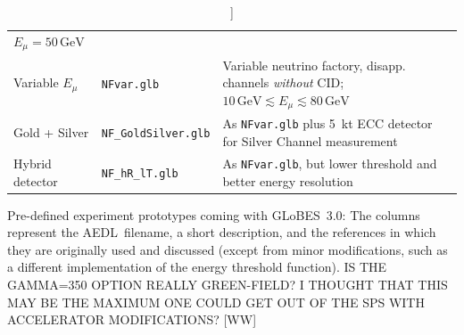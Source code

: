 \documentclass[12pt,a4paper]{article}
\newcommand{\capdef}{}
\newcommand{\mycaption}[2][\capdef]{\renewcommand{\capdef}{#2}%
       \caption[#1]{{\footnotesize #2}}}
\newcommand{\GLOBESN}{{\sf GLoBES~3.0}}
\newcommand{\AEDL}{{\sf AEDL}}
\begin{document}
\begin{table}[t!]
{\begin{center}
\begin{tabular}{llp{7.0cm}c}
$E_\mu = 50 \, \mathrm{GeV}$ & \cite{Huber:2002mx} \\
Variable $E_\mu$ & {\tt NFvar.glb} & Variable neutrino factory, disapp. channels
{\em without} CID; $10 \, \mathrm{GeV} \lesssim E_\mu \lesssim 80 \, \mathrm{GeV}$ & \cite{Huber:2002mx,Huber:2006wb}  \\
Gold + Silver & {\tt NF\_GoldSilver.glb} & As {\tt NFvar.glb} 
plus 5~kt ECC detector for Silver Channel
measurement & \cite{Huber:2002mx,Huber:2006wb,Autiero:2003fu} \\
Hybrid detector & {\tt NF\_hR\_lT.glb} & As {\tt NFvar.glb}, but 
lower threshold and better energy resolution & \cite{Huber:2002mx,Huber:2006wb} \\
\hline
\end{tabular}
\end{center}
} %
\mycaption{\label{tab:experiments} 
Pre-defined experiment prototypes coming with \GLOBESN : The columns represent the \AEDL\ filename, 
a short description, and the references in which they are originally used and 
discussed (except from minor modifications, such as a different implementation of 
the energy threshold function). 
%
IS THE GAMMA=350 OPTION REALLY GREEN-FIELD? I THOUGHT THAT THIS MAY BE THE MAXIMUM
ONE COULD GET OUT OF THE SPS WITH ACCELERATOR MODIFICATIONS? [WW]
}
\end{table}
\end{document}
